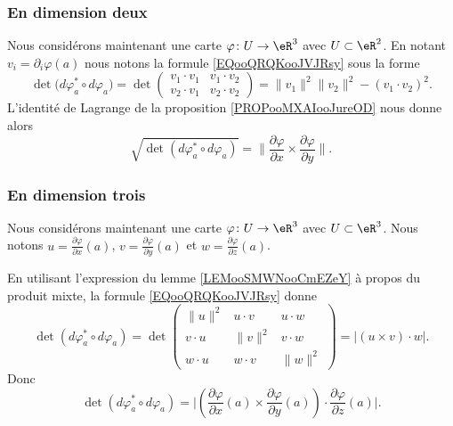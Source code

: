 \subsubsection{En dimension deux}

Nous considérons maintenant une carte \( \varphi\colon U\to \eR^3\) avec \( U\subset \eR^2\). En notant \( v_i=\partial_i\varphi(a)\) nous notons la formule \eqref{EQooQRQKooJVJRsy} sous la forme
\begin{equation}
	\det\big( d\varphi_a^*\circ d\varphi_a \big)=
	\det\begin{pmatrix}
		v_1\cdot v_1 & v_1\cdot v_2 \\
		v_2\cdot v_1 & v_2\cdot v_2
	\end{pmatrix}=\| v_1 \|^2\| v_2 \|^2-(v_1\cdot v_2)^2.
\end{equation}
L'identité de Lagrange de la proposition \ref{PROPooMXAIooJureOD} nous donne alors
\begin{equation}
	\sqrt{ \det(d\varphi_a^*\circ d\varphi_a )  }=\| \frac{ \partial \varphi }{ \partial x }\times \frac{ \partial \varphi }{ \partial y } \|.
\end{equation}

\subsubsection{En dimension trois}

Nous considérons maintenant une carte \( \varphi\colon U\to \eR^3\) avec \( U\subset \eR^3\). Nous notons \( u=\frac{ \partial \varphi }{ \partial x }(a)\), \( v=\frac{ \partial \varphi }{ \partial y }(a)\) et \( w=\frac{ \partial \varphi }{ \partial z }(a)\).

En utilisant l'expression du lemme \ref{LEMooSMWNooCmEZeY} à propos du produit mixte, la formule \ref{EQooQRQKooJVJRsy} donne
\begin{equation}
	\det(d\varphi_a^*\circ d\varphi_a)=\det\begin{pmatrix}
		\| u \|^2 & u\cdot v  & u\cdot w  \\
		v\cdot u  & \| v \|^2 & v\cdot w  \\
		w\cdot u  & w\cdot v  & \| w \|^2
	\end{pmatrix}=\big| (u\times v)\cdot w \big|.
\end{equation}
Donc
\begin{equation}        \label{EQooYIJSooHtkXfu}
	\det(d\varphi_a^*\circ d\varphi_a)=\big| (\frac{ \partial \varphi }{ \partial x }(a)\times \frac{ \partial \varphi }{ \partial y }(a))\cdot \frac{ \partial \varphi }{ \partial z }(a) \big|.
\end{equation}


